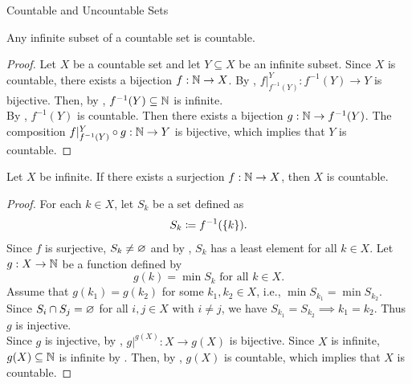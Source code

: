 \begin{section}{Countable and Uncountable Sets}
\bigskip

\begin{theorem} \label{thm:InfiniteSubsetOfCountableSetIsCountable}
    Any infinite subset of a countable set is countable.
\end{theorem}

\begin{proof}
    Let $X$ be a countable set and let $Y \subseteq X$ be an infinite subset. Since $X$ is countable, there exists
    a bijection $f: \N \to X$. By , $f|_{f^{-1}(Y)}^{Y}: f^{-1}(Y) \to Y$
    is bijective. Then, by , $f^{-1}(Y) \subseteq \N$ is infinite.
    \\[6mm]
    By , $f^{-1}(Y)$ is countable. Then there exists a bijection $g: \N \to f^{-1}(Y)$.
    The composition $f|_{f^{-1}(Y)}^{Y} \circ g: \N \to Y$ is bijective, which implies that $Y$ is countable.
\end{proof}

\bigskip

\begin{theorem} \label{thm:SurjectionFromN}
    Let $X$ be infinite. If there exists a surjection $f: \N \to X$, then $X$ is countable.
\end{theorem}

\begin{proof}
    For each $k \in X$, let $S_{k}$ be a set defined as
    \[
    S_{k} \coloneqq f^{-1}(\set*{k}).
    \]
    Since $f$ is surjective, $S_{k} \neq \vnot$ and by ,
    $S_{k}$ has a least element for all $k \in X$. Let $g: X \to \N$ be a function defined by
    \[
    g(k) = \min S_{k} \text{ for all } k \in X.
    \]
    Assume that $g(k_{1}) = g(k_{2})$ for some $k_{1}, k_{2} \in X$, i.e., $\min S_{k_{1}} = \min S_{k_{2}}$. Since
    $S_{i} \cap S_{j} = \vnot$ for all $i, j \in X$ with $i \neq j$, we have $S_{k_{1}} = S_{k_{2}} \implies
    k_{1} = k_{2}$. Thus $g$ is injective.
    \\[6mm]
    Since $g$ is injective, by , $g|^{g(X)}: X \to g(X)$ is bijective.
    Since $X$ is infinite, $g(X) \subseteq \N$ is infinite by . Then, by
    , $g(X)$ is countable, which implies that $X$ is countable.
\end{proof}

\bigskip


\end{section}
